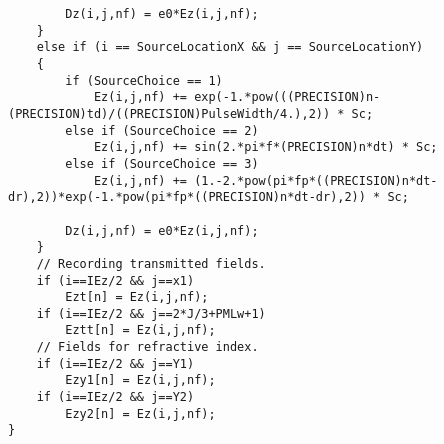 \begin{lstlisting}
		Dz(i,j,nf) = e0*Ez(i,j,nf);
	}
	else if (i == SourceLocationX && j == SourceLocationY)
	{
		if (SourceChoice == 1)
			Ez(i,j,nf) += exp(-1.*pow(((PRECISION)n-(PRECISION)td)/((PRECISION)PulseWidth/4.),2)) * Sc;
		else if (SourceChoice == 2)
			Ez(i,j,nf) += sin(2.*pi*f*(PRECISION)n*dt) * Sc;
		else if (SourceChoice == 3)
			Ez(i,j,nf) += (1.-2.*pow(pi*fp*((PRECISION)n*dt-dr),2))*exp(-1.*pow(pi*fp*((PRECISION)n*dt-dr),2)) * Sc;

		Dz(i,j,nf) = e0*Ez(i,j,nf);
	}
	// Recording transmitted fields.
	if (i==IEz/2 && j==x1)
		Ezt[n] = Ez(i,j,nf);
	if (i==IEz/2 && j==2*J/3+PMLw+1)
		Eztt[n] = Ez(i,j,nf);
	// Fields for refractive index.
	if (i==IEz/2 && j==Y1)
		Ezy1[n] = Ez(i,j,nf);
	if (i==IEz/2 && j==Y2)
		Ezy2[n] = Ez(i,j,nf);
}
\end{lstlisting}